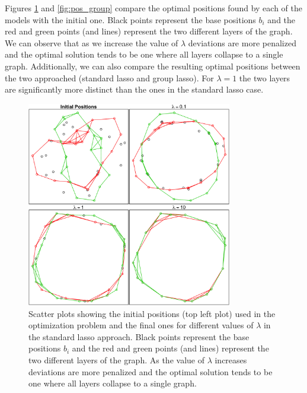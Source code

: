 \documentclass{article}
\begin{document}
Figures \ref{fig:pos_lasso} and \ref{fig:pos_group} compare the optimal positions found by each of the models with the initial one. Black points represent the base positions $b_i$ and the red and green points (and lines) represent the two different layers of the graph. We can observe that as we increase the value of $\lambda$ deviations are more penalized and the optimal solution tends to be one where all layers collapse to a single graph. Additionally, we can also compare the resulting optimal positions between the two approached (standard lasso and group lasso). For $\lambda=1$ the two layers are significantly more distinct than the ones in the standard lasso case.

\begin{figure}[h!]
   \centering
   \includegraphics[width=0.8\textwidth]{plot_positions_individual} %
   \caption{Scatter plots showing the initial positions (top left plot) used in the optimization problem and the final ones for different values of $\lambda$ in the standard lasso approach. Black points represent the base positions $b_i$ and the red and green points (and lines) represent the two different layers of the graph. As the value of $\lambda$ increases deviations are more penalized and the optimal solution tends to be one where all layers collapse to a single graph.}
   \label{fig:pos_lasso}
\end{figure}
\end{document}
